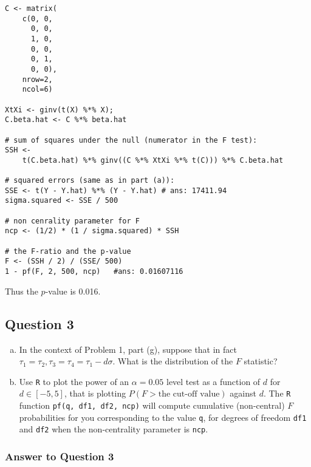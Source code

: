 \documentclass[paper=a4, fontsize=11pt]{scrartcl} %
\begin{document}
\begin{enumerate}[(a)]
\begin{lstlisting}[basicstyle=\ttfamily\small\bfseries]
C <- matrix( 
    c(0, 0, 
      0, 0, 
      1, 0,
      0, 0, 
      0, 1,
      0, 0),
    nrow=2, 
    ncol=6) 

XtXi <- ginv(t(X) %*% X); 
C.beta.hat <- C %*% beta.hat

# sum of squares under the null (numerator in the F test):
SSH <- 
    t(C.beta.hat) %*% ginv((C %*% XtXi %*% t(C))) %*% C.beta.hat

# squared errors (same as in part (a)):
SSE <- t(Y - Y.hat) %*% (Y - Y.hat) # ans: 17411.94
sigma.squared <- SSE / 500

# non cenrality parameter for F
ncp <- (1/2) * (1 / sigma.squared) * SSH

# the F-ratio and the p-value
F <- (SSH / 2) / (SSE/ 500)
1 - pf(F, 2, 500, ncp)   #ans: 0.01607116
\end{lstlisting}

Thus the $p$-value is 0.016. 

\end{enumerate}
\bigskip
\bigskip
\subsection*{Question 3} 
\begin{enumerate}[(a)]
\item In the context of Problem 1, part (g), suppose that in fact $\tau_1 = \tau_2, \tau_3 = \tau_4 = \tau_1 - d\sigma$. What is the distribution of the $F$ statistic?\\
 
\item Use \texttt{R} to plot the power of an $\alpha = 0.05$ level test as a function of $d$ for $d \in [-5, 5]$, that is plotting $P(F > \text{the cut-off value})$ against $d$.  The \texttt{R} function \texttt{pf(q, df1, df2, ncp)} will compute cumulative (non-central) $F$ probabilities for you corresponding to the value \texttt{q}, for degrees of
freedom \texttt{df1} and \texttt{df2} when the non-centrality parameter is \texttt{ncp}.
\end{enumerate}

\bigskip
\subsubsection*{Answer to Question 3}


\bigskip
\bigskip
\end{document}
